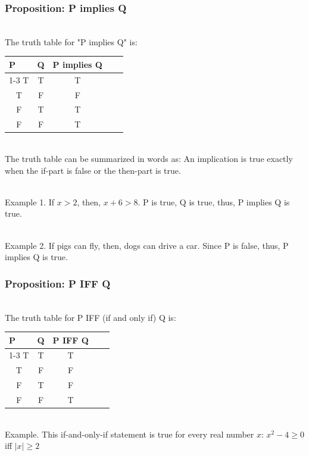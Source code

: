 \documentclass{beamer}
\numberwithin{equation}{section}
\begin{document}
\begin{frame}
\frametitle{Proposition: P implies Q}

\ \\The truth table for "P implies Q" is:

\begin{table}[]
\begin{tabular}{cccll}
\multicolumn{1}{l}{P} & \multicolumn{1}{l}{Q} & \multicolumn{1}{l}{P implies Q} &  &  \\ \cline{1-3}
T                     & T                     & T                               &  &  \\
T                     & F                     & F                               &  &  \\
F                     & T                     & T                               &  &  \\
F                     & F                     & T                               &  & 
\end{tabular}
\end{table} \pause

\ \\The truth table can be summarized in words as: An implication is true exactly when the if-part is false or the then-part is true. \pause

\ \\Example 1. If $x > 2$, then, $x + 6 > 8$. P is true, Q is true, thus, P implies Q is true. \pause

\ \\Example 2. If pigs can fly, then, dogs can drive a car. Since P is false, thus, P implies Q is true.

\end{frame}



\begin{frame}
\frametitle{Proposition: P IFF Q}

\ \\The truth table for P IFF (if and only if) Q is:

\begin{table}[]
\begin{tabular}{cccll}
\multicolumn{1}{l}{P} & \multicolumn{1}{l}{Q} & \multicolumn{1}{l}{P IFF Q} &  &  \\ \cline{1-3}
T                     & T                     & T                               &  &  \\
T                     & F                     & F                               &  &  \\
F                     & T                     & F                               &  &  \\
F                     & F                     & T                               &  & 
\end{tabular}
\end{table} \pause

\ \\Example. This if-and-only-if statement is true for every real number $x$: $x^{2} - 4 \geq 0$ iff $|x| \geq 2$

\end{frame}
\end{document}
